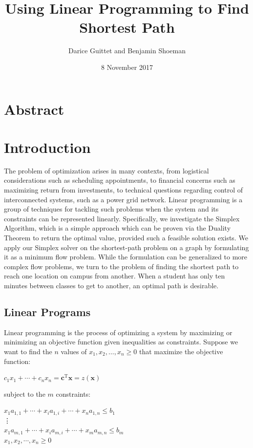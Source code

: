 \documentclass[12pt]{article}
\title{Using Linear Programming to Find Shortest Path}
\author{Darice Guittet and Benjamin Shoeman}
\date{8 November 2017}
\begin{document}
\maketitle

\section{Abstract}



\section{Introduction}
The problem of optimization arises in many contexts, from logistical considerations such as scheduling appointments, to financial concerns such as maximizing return from investments, to technical questions regarding control of interconnected systems, such as a power grid network. Linear programming is a group of techniques for tackling such problems when the system and its constraints can be represented linearly. Specifically, we investigate the Simplex Algorithm, which is a simple approach which can be proven via the Duality Theorem to return the optimal value, provided such a feasible solution exists. We apply our Simplex solver on the shortest-path problem on a graph by formulating it as a minimum flow problem. While the formulation can be generalized to more complex flow problems, we turn to the problem of finding the shortest path to reach one location on campus from another. When a student has only ten minutes between classes to get to another, an optimal path is desirable. 

\subsection{Linear Programs}
Linear programming is the process of optimizing a system by maximizing or minimizing an objective function given inequalities as constraints. Suppose we want to find the $n$ values of $x_1, x_2, \ldots, x_n \geq 0$ that maximize the objective function:

\begin{center}
     $c_1x_1 + \cdots + c_nx_n = \mathbf{c}^\text{T}\mathbf{x} = z(\mathbf{x})$\\
\end{center}

subject to the $m$ constraints:
\begin{center}
    $x_1a_{1,1} +  \cdots + x_ia_{1,i} + \cdots +  x_na_{1,n} \leq b_1$ \\
\hspace{0cm} \vdots \\
    $x_1a_{m,1} + \cdots + x_ia_{m,i} + \cdots +  x_ma_{m,n} \leq b_m$ \\
    $x_1, x_2, \cdots, x_n \geq 0$
\end{center} 
\end{document}
